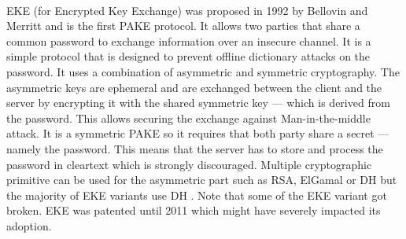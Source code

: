 ﻿\documentclass[../report.tex]{subfiles}
\begin{document}
\paragraph{}
EKE (for Encrypted Key Exchange) was proposed in 1992 by Bellovin and Merritt \cite{EKE_Paper} and is the first PAKE protocol. 
It allows two parties that share a common password to exchange information over an insecure channel.
It is a simple protocol that is designed to prevent offline dictionary attacks on the password.
It uses a combination of asymmetric and symmetric cryptography.
The asymmetric keys are ephemeral and are exchanged between the client and the server by encrypting it with the shared symmetric key --- which is derived from the password.
This allows securing the exchange against Man-in-the-middle attack. %
It is a symmetric PAKE so it requires that both party share a secret --- namely the password. This means that the server has to store and process the password in cleartext which is strongly discouraged. %
Multiple cryptographic primitive can be used for the asymmetric part such as RSA, ElGamal or DH but the majority of EKE variants use DH \cite{Breaking_EKE}. %
Note that some of the EKE variant got broken. 
EKE was patented until 2011 which might have severely impacted its adoption.
\end{document}
